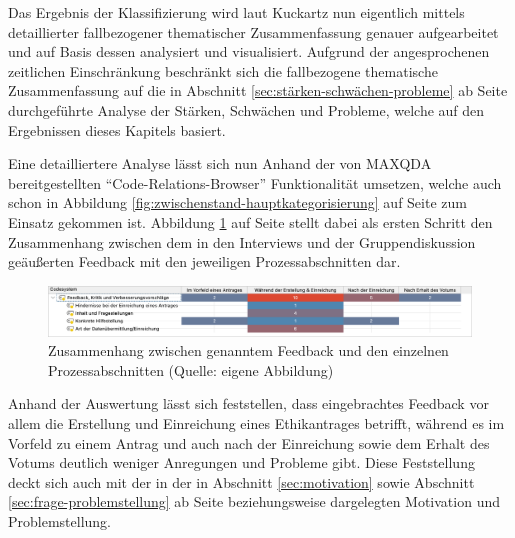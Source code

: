 \documentclass[a4paper,12pt,twoside]{scrreprt}
\begin{document}
Das Ergebnis der Klassifizierung wird laut Kuckartz nun eigentlich mittels detaillierter fallbezogener thematischer Zusammenfassung genauer aufgearbeitet und auf Basis dessen analysiert und visualisiert. \cite[111-121]{kuckartz_qualitative_2018} Aufgrund der angesprochenen zeitlichen Einschränkung beschränkt sich die fallbezogene thematische Zusammenfassung auf die in Abschnitt \ref{sec:stärken-schwächen-probleme} ab Seite \pageref{sec:stärken-schwächen-probleme} durchgeführte Analyse der Stärken, Schwächen und Probleme, welche auf den Ergebnissen dieses Kapitels basiert.

\medskip

Eine detailliertere Analyse lässt sich nun Anhand der von MAXQDA bereitgestellten \enquote{Code-Relations-Browser} Funktionalität umsetzen, welche auch schon in Abbildung \ref{fig:zwischenstand-hauptkategorisierung} auf Seite \pageref{fig:zwischenstand-hauptkategorisierung} zum Einsatz gekommen ist. Abbildung \ref{fig:feedback-x-prozess} auf Seite \pageref{fig:feedback-x-prozess} stellt dabei als ersten Schritt den Zusammenhang zwischen dem in den Interviews und der Gruppendiskussion geäußerten Feedback mit den jeweiligen Prozessabschnitten dar.

\begin{figure}[ht]
    \centering
    \includegraphics[width=\linewidth]{thesis/images/Luidold_Feedback-Prozess.png}
    \caption[Zusammenhang zwischen genanntem Feedback und den einzelnen Prozessabschnitten]{Zusammenhang zwischen genanntem Feedback und den einzelnen Prozessabschnitten (Quelle: eigene Abbildung)}
    \label{fig:feedback-x-prozess}
\end{figure}

Anhand der Auswertung lässt sich feststellen, dass eingebrachtes Feedback vor allem die Erstellung und Einreichung eines Ethikantrages betrifft, während es im Vorfeld zu einem Antrag und auch nach der Einreichung sowie dem Erhalt des Votums deutlich weniger Anregungen und Probleme gibt. Diese Feststellung deckt sich auch mit der in der in Abschnitt \ref{sec:motivation} sowie Abschnitt \ref{sec:frage-problemstellung} ab Seite \pageref{sec:motivation} beziehungsweise \pageref{sec:frage-problemstellung} dargelegten Motivation und Problemstellung.

\medskip
\end{document}
